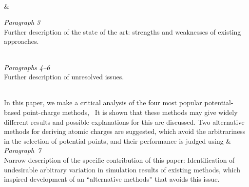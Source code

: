 \begin{longtblr}{}
{		\\
		\null\hspace{\smalllinespacing}\textellipsis
	}
	&
	{%
		\textit{Paragraph 3} \\
		Further description of the state of the art: strengths and weaknesses of existing approaches. \\
		\strut \\[2ex]
		\textit{Paragraphs 4--6} \\
		Further description of unresolved issues.
	}
	\\
	\hspace{\smalllinespacing}In this paper, we make a critical analysis of the four most popular potential-based point-charge methods, \textellipsis\ It is shown that these methods may give widely different results and possible explanations for this are discussed. Two alternative methods for deriving atomic charges are suggested, which avoid the arbitrariness in the selection of potential points, and their performance is judged using \textellipsis
	&
	{%
		\textit{Paragraph~7} \\
		Narrow description of the specific contribution of this paper: Identification of undesirable arbitrary variation in simulation results of existing methods, which inspired development of an ``alternative methods'' that avoids this issue.
	}
\end{longtblr}

